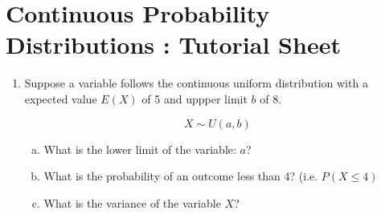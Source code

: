 \documentclass[a4paper,12pt]{article}
\begin{document}
\section*{Continuous Probability Distributions : Tutorial Sheet}

\begin{enumerate}
    \item 
Suppose a variable follows the continuous uniform distribution with a expected value $E(X)$ of 5 and uppper limit $b$ of 8.

\[ X \sim U(a,b)\]


\begin{enumerate}[(a)]
\item What is the lower limit of the variable: $a$? 
\item What is the probability of an outcome less than 4? (i.e. $P(X\leq 4)$


\item What is the variance of the variable $X$?
\end{enumerate}

\end{enumerate}
\end{document}
